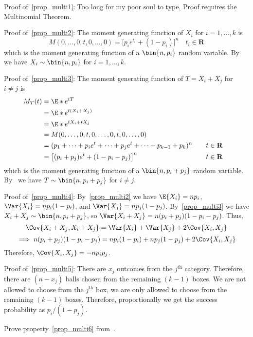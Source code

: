 \begin{Proof}{}{}
    Proof of~\ref{prop_multi1}: Too long
    for my poor soul to type. Proof requires the Multinomial Theorem.

    Proof of~\ref{prop_multi2}: The moment
    generating function of $ X_i $ for $ i=1,\ldots,k $ is
    \[ M(0,\ldots,0,t,0,\ldots,0)=\bigl[p_i e^{t_i}+(1-p_i)\bigr]^n
        \quad t_i\in\mathbf{R} \]
    which is the moment generating function of a
    $ \bin{n,p_i} $ random variable. By~
    we have $ X_i \sim \bin{n,p_i} $ for $ i=1,\ldots,k $.

    Proof of~\ref{prop_multi3}: The moment
    generating function of $ T=X_i+X_j $ for $ i\neq j $ is
    \begin{align*}
        M_T(t)
         & =\E*{e^{tT}}                                                                         \\
         & =\E*{e^{t(X_i+X_j)}}                                                                 \\
         & =\E*{e^{t X_i+t X_j}}                                                                \\
         & =M(0,\ldots,0,t,0,\ldots,0,t,0,\ldots,0)                                             \\
         & =(p_1+\cdots+p_i e^{t}+\cdots+p_j e^t+\cdots+p_{k-1}+p_k)^n & \quad & t\in\mathbf{R} \\
         & =\bigl[ (p_i+p_j)e^t+(1-p_i-p_j) \bigr]^n                   &       & t\in\mathbf{R}
    \end{align*}
    which is the moment generating function of a
    $ \bin{n,p_i+p_j} $ random variable. By~
    we have $ T \sim \bin{n,p_i+p_j} $ for $ i\neq j $.

    Proof of~\ref{prop_multi4}:
    By~\ref{prop_multi2} we have $ \E{X_i}=n p_i $, $ \Var{X_i}=np_i(1-p_i) $,
    and $ \Var{X_j}=np_j(1-p_j) $. By~\ref{prop_multi3} we have
    $ X_i+X_j \sim \bin{n,p_i+p_j} $, so
    $ \Var{X_i+X_j}=n(p_i+p_j)(1-p_i-p_j) $.
    Thus,
    \[ \Cov{X_i+X_j,X_i+X_j}=\Var{X_i}+\Var{X_j}+2\Cov{X_i,X_j} \]
    \[ \implies n(p_i+p_j)(1-p_i-p_j)=np_i(1-p_i)+np_j(1-p_j)
        +2\Cov{X_i,X_j} \]
    Therefore, $ \Cov{X_i,X_j}=-n p_i p_j $.

    Proof of~\ref{prop_multi5}: There are $ x_j $ outcomes
    from the $ j^{\text{th}} $ category. Therefore,
    there are $ (n-x_j) $ balls chosen from the remaining $ (k-1) $
    boxes. We are not allowed to choose from the $ j^{\text{th}} $ box,
    we are only allowed to choose from the remaining $ (k-1) $
    boxes. Therefore, proportionally we get the success probability
    as $ p_i/(1-p_j) $.
\end{Proof}
\begin{Exercise}{}{}
    Prove property~\ref{prop_multi6} from~.
\end{Exercise}
